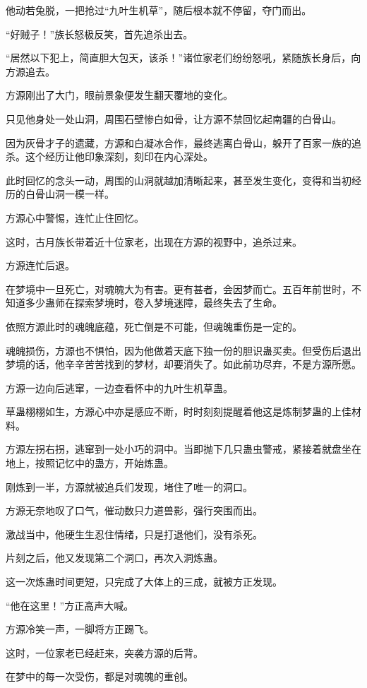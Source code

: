 \begin{this_body}
他动若兔脱，一把抢过“九叶生机草”，随后根本就不停留，夺门而出。

“好贼子！”族长怒极反笑，首先追杀出去。

“居然以下犯上，简直胆大包天，该杀！”诸位家老们纷纷怒吼，紧随族长身后，向方源追去。

方源刚出了大门，眼前景象便发生翻天覆地的变化。

只见他身处一处山洞，周围石壁惨白如骨，让方源不禁回忆起南疆的白骨山。

因为灰骨才子的遗藏，方源和白凝冰合作，最终逃离白骨山，躲开了百家一族的追杀。这个经历让他印象深刻，刻印在内心深处。

此时回忆的念头一动，周围的山洞就越加清晰起来，甚至发生变化，变得和当初经历的白骨山洞一模一样。

方源心中警惕，连忙止住回忆。

这时，古月族长带着近十位家老，出现在方源的视野中，追杀过来。

方源连忙后退。

在梦境中一旦死亡，对魂魄大为有害。更有甚者，会因梦而亡。五百年前世时，不知道多少蛊师在探索梦境时，卷入梦境迷障，最终失去了生命。

依照方源此时的魂魄底蕴，死亡倒是不可能，但魂魄重伤是一定的。

魂魄损伤，方源也不惧怕，因为他做着天底下独一份的胆识蛊买卖。但受伤后退出梦境的话，他辛辛苦苦找到的梦材，却要消失了。如此前功尽弃，不是方源所愿。

方源一边向后逃窜，一边查看怀中的九叶生机草蛊。

草蛊栩栩如生，方源心中亦是感应不断，时时刻刻提醒着他这是炼制梦蛊的上佳材料。

方源左拐右拐，逃窜到一处小巧的洞中。当即抛下几只蛊虫警戒，紧接着就盘坐在地上，按照记忆中的蛊方，开始炼蛊。

刚炼到一半，方源就被追兵们发现，堵住了唯一的洞口。

方源无奈地叹了口气，催动数只力道兽影，强行突围而出。

激战当中，他硬生生忍住情绪，只是打退他们，没有杀死。

片刻之后，他又发现第二个洞口，再次入洞炼蛊。

这一次炼蛊时间更短，只完成了大体上的三成，就被方正发现。

“他在这里！”方正高声大喊。

方源冷笑一声，一脚将方正踢飞。

这时，一位家老已经赶来，突袭方源的后背。

在梦中的每一次受伤，都是对魂魄的重创。


\end{this_body}
